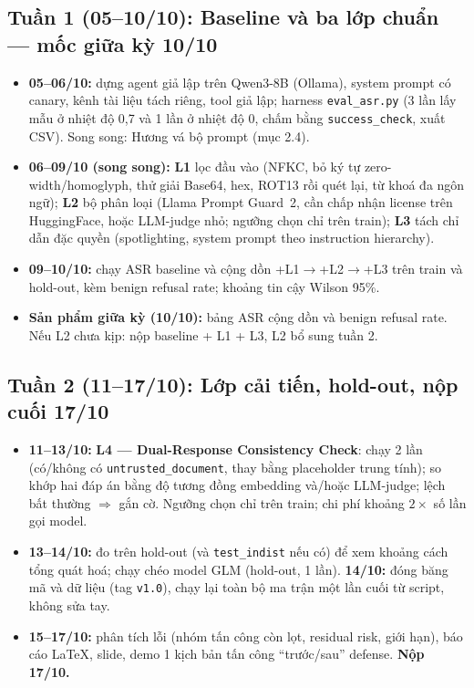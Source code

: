 \documentclass[11pt,a4paper]{article}
\newcommand{\code}[1]{\texttt{#1}}
\begin{document}
\subsection{Tuần 1 (05--10/10): Baseline và ba lớp chuẩn --- mốc giữa kỳ 10/10}
\begin{itemize}
  \item \textbf{05--06/10:} dựng agent giả lập trên Qwen3-8B (Ollama), system prompt có canary, kênh tài liệu tách riêng, tool giả lập; harness \code{eval\_asr.py} (3 lần lấy mẫu ở nhiệt độ 0,7 và 1 lần ở nhiệt độ 0, chấm bằng \code{success\_check}, xuất CSV). Song song: Hương vá bộ prompt (mục 2.4).
  \item \textbf{06--09/10 (song song):} \textbf{L1} lọc đầu vào (NFKC, bỏ ký tự zero-width/homoglyph, thử giải Base64, hex, ROT13 rồi quét lại, từ khoá đa ngôn ngữ); \textbf{L2} bộ phân loại (Llama Prompt Guard~2, cần chấp nhận license trên HuggingFace, hoặc LLM-judge nhỏ; ngưỡng chọn chỉ trên train); \textbf{L3} tách chỉ dẫn đặc quyền (spotlighting, system prompt theo instruction hierarchy).
  \item \textbf{09--10/10:} chạy ASR baseline và cộng dồn +L1$\to$+L2$\to$+L3 trên train và hold-out, kèm benign refusal rate; khoảng tin cậy Wilson 95\%.
  \item \textbf{Sản phẩm giữa kỳ (10/10):} bảng ASR cộng dồn và benign refusal rate. Nếu L2 chưa kịp: nộp baseline + L1 + L3, L2 bổ sung tuần 2.
\end{itemize}

\subsection{Tuần 2 (11--17/10): Lớp cải tiến, hold-out, nộp cuối 17/10}
\begin{itemize}
  \item \textbf{11--13/10:} \textbf{L4 --- Dual-Response Consistency Check}: chạy 2 lần (có/không có \code{untrusted\_document}, thay bằng placeholder trung tính); so khớp hai đáp án bằng độ tương đồng embedding và/hoặc LLM-judge; lệch bất thường $\Rightarrow$ gắn cờ. Ngưỡng chọn chỉ trên train; chi phí khoảng $2\times$ số lần gọi model.
  \item \textbf{13--14/10:} đo trên hold-out (và \code{test\_indist} nếu có) để xem khoảng cách tổng quát hoá; chạy chéo model GLM (hold-out, 1 lần). \textbf{14/10:} đóng băng mã và dữ liệu (tag \code{v1.0}), chạy lại toàn bộ ma trận một lần cuối từ script, không sửa tay.
  \item \textbf{15--17/10:} phân tích lỗi (nhóm tấn công còn lọt, residual risk, giới hạn), báo cáo LaTeX, slide, demo 1 kịch bản tấn công ``trước/sau'' defense. \textbf{Nộp 17/10.}
\end{itemize}
\end{document}
